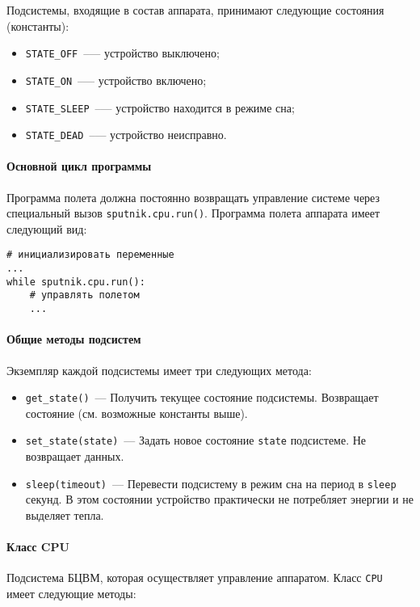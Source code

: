 \documentclass[12pt,a4paper]{article}
\begin{document}
Подсистемы, входящие в состав аппарата, принимают следующие состояния (константы):

\begin{itemize}
\item \verb'STATE_OFF'~--— устройство выключено;
\item \verb'STATE_ON'~--— устройство включено;
\item \verb'STATE_SLEEP'~--— устройство находится в режиме сна;
\item \verb'STATE_DEAD'~--— устройство неисправно.
\end{itemize}
    
\paragraph{Основной цикл программы}

Программа полета должна постоянно возвращать управление системе через специальный вызов
\verb'sputnik.cpu.run()'. Программа полета аппарата имеет следующий вид:

\begin{verbatim}
# инициализировать переменные
...
while sputnik.cpu.run():
    # управлять полетом
    ...
\end{verbatim}

\paragraph{Общие методы подсистем}

Экземпляр каждой подсистемы имеет три следующих метода:

\begin{itemize}
\item \verb'get_state()'~--- Получить текущее состояние подсистемы. Возвращает состояние
  (см. возможные константы выше).
\item \verb'set_state(state)'~--- Задать новое состояние \verb'state' подсистеме. Не возвращает данных.
\item \verb'sleep(timeout)'~--- Перевести подсистему в режим сна на период в \verb'sleep'
  секунд. В этом состоянии устройство практически не потребляет энергии и не выделяет
  тепла.
\end{itemize}

\paragraph{Класс CPU}

Подсистема БЦВМ, которая осуществляет управление аппаратом. Класс \verb'CPU' имеет следующие
методы:
\end{document}
